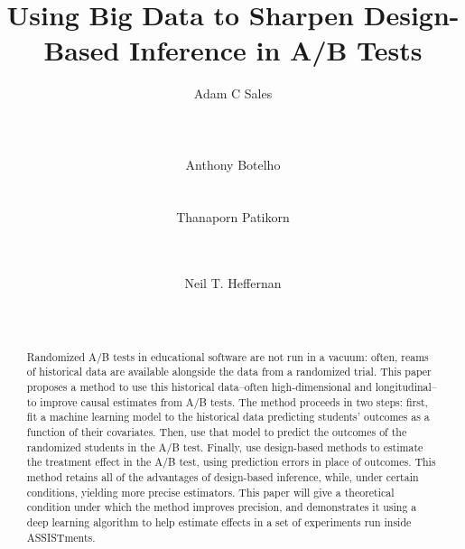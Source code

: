 \documentclass{edm_template}
\begin{document}
\title{Using Big Data to Sharpen Design-Based Inference in A/B Tests}

\author{
\alignauthor Adam C Sales\\
       \\
       \\
       \\
\alignauthor Anthony Botelho\\
       \\
       \\
\alignauthor Thanaporn Patikorn\\
       \\
       \\
\and  %
\alignauthor Neil T. Heffernan\\
       \\
       \\
}

\maketitle
\begin{abstract}
Randomized A/B tests in educational software are not run in a vacuum: often, reams of historical data are available alongside the data from a randomized trial. This paper proposes a method to use this historical data--often high-dimensional and longitudinal--to improve causal estimates from A/B tests. The method proceeds in two steps: first, fit a machine learning model to the historical data predicting students' outcomes as a function of their covariates. Then, use that model to predict the outcomes of the randomized students in the A/B test. Finally, use design-based methods to estimate the treatment effect in the A/B test, using prediction errors in place of outcomes. This method retains all of the advantages of design-based inference, while, under certain conditions, yielding more precise estimators. This paper will give a theoretical condition under which the method improves precision, and demonstrates it using a deep learning algorithm to help estimate effects in a set of experiments run inside ASSISTments.
% 
% 
\end{abstract}
\end{document}
